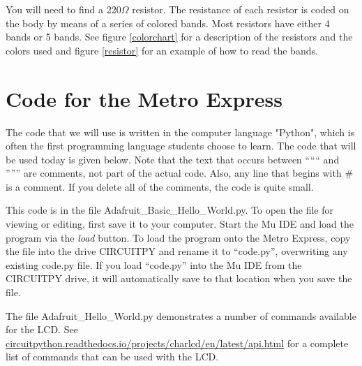 \documentclass[]{article}
\begin{document}
You will need to find a 220$\Omega$ resistor.  The resistance of each resistor is coded on the body  by means of a series of colored bands.  Most resistors have either 4 bands or 5 bands.  See figure \ref{colorchart} for a description of the resistors and the colors used and figure \ref{resistor} for an example of how to read the bands.


\section{Code for the Metro Express}

The code that we will use is written in the computer language "Python", which is often the first programming language students choose to learn.  The code that will be used today is given below.  Note that the text that occurs between 
`````` 
and 
''''''
are comments, not part of the actual code.  Also, any line that begins with \# is a comment. If you delete all of the comments, the code is quite small.

This code is in the file Adafruit\_Basic\_Hello\_World.py.  To open the file for viewing or editing, first save it to your computer. Start the Mu IDE and load the program via the \textit{load} button.  To load the program onto the Metro Express, copy the file into the drive CIRCUITPY and rename it to ``code.py'', overwriting any existing code.py file.  If you load ``code.py'' into the Mu IDE from the CIRCUITPY drive, it will automatically save to that location when you save the file.

The file Adafruit\_Hello\_World.py demonstrates a number of commands available for the LCD.  See \href{https://circuitpython.readthedocs.io/projects/charlcd/en/latest/api.html}{circuitpython.readthedocs.io/projects/charlcd/en/latest/api.html} for a complete list of commands that can be used with the LCD.
\bigskip
\end{document}
